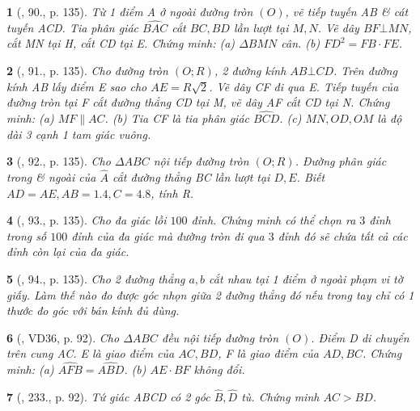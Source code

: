\documentclass{article}
\newtheorem{baitoan}{}
\begin{document}
\begin{baitoan}[\cite{Tuyen_Toan_9_old}, 90., p. 135]
	Từ 1 điểm A ở ngoài đường tròn $(O)$, vẽ tiếp tuyến AB \& cát tuyến ACD. Tia phân giác $\widehat{BAC}$ cắt $BC,BD$ lần lượt tại $M,N$. Vẽ dây $BF\bot MN$, cắt MN tại H, cắt CD tại E. Chứng minh: (a) $\Delta BMN$ cân. (b) $FD^2 = FB\cdot FE$.
\end{baitoan}

\begin{baitoan}[\cite{Tuyen_Toan_9_old}, 91., p. 135]
	Cho đường tròn $(O;R)$, 2 đường kính $AB\bot CD$. Trên đường kính AB lấy điểm E sao cho $AE = R\sqrt{2}$. Vẽ dây CF đi qua E. Tiếp tuyến của đường tròn tại F cắt đường thẳng CD tại M, vẽ dây AF cắt CD tại N. Chứng minh: (a) $MF\parallel AC$. (b) Tia CF là tia phân giác $\widehat{BCD}$. (c) $MN,OD,OM$ là độ dài 3 cạnh 1 tam giác vuông.
\end{baitoan}

\begin{baitoan}[\cite{Tuyen_Toan_9_old}, 92., p. 135]
	Cho $\Delta ABC$ nội tiếp đường tròn $(O;R)$. Đường phân giác trong \& ngoài của $\widehat{A}$ cắt đường thẳng BC lần lượt tại $D,E$. Biết $AD = AE,AB = 1.4,C = 4.8$, tính R.
\end{baitoan}

\begin{baitoan}[\cite{Tuyen_Toan_9_old}, 93., p. 135]
	Cho đa giác lồi $100$ đỉnh. Chứng minh có thể chọn ra $3$ đỉnh trong số $100$ đỉnh của đa giác mà đường tròn đi qua $3$ đỉnh đó sẽ chứa tất cả các đỉnh còn lại của đa giác.
\end{baitoan}

\begin{baitoan}[\cite{Tuyen_Toan_9_old}, 94., p. 135]
	Cho 2 đường thẳng $a,b$ cắt nhau tại 1 điểm ở ngoài phạm vi tờ giấy. Làm thế nào đo được góc nhọn giữa 2 đường thẳng đó nếu trong tay chỉ có 1 thước đo góc với bán kính đủ dùng.
\end{baitoan}

\begin{baitoan}[\cite{Binh_Toan_9_tap_2}, VD36, p. 92]
	Cho $\Delta ABC$ đều nội tiếp đường tròn $(O)$. Điểm D di chuyển trên cung AC. E là giao điểm của $AC,BD$, F là giao điểm của $AD,BC$. Chứng minh: (a) $\widehat{AFB} = \widehat{ABD}$. (b) $AE\cdot BF$ không đổi.
\end{baitoan}

\begin{baitoan}[\cite{Binh_Toan_9_tap_2}, 233., p. 92]
	Tứ giác ABCD có 2 góc $\widehat{B},\widehat{D}$ tù. Chứng minh $AC > BD$.
\end{baitoan}
\end{document}
